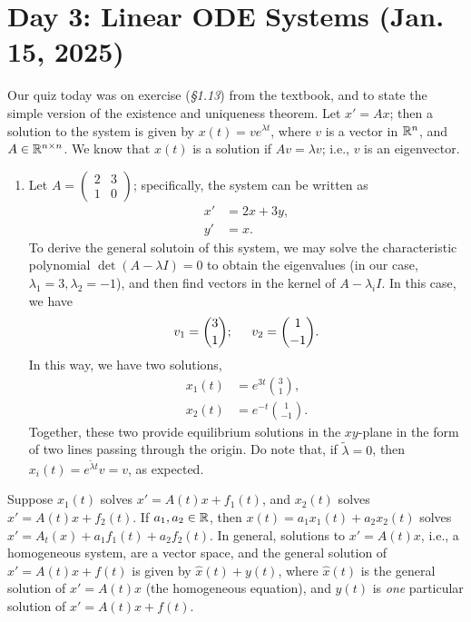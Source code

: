 \section{Day 3: Linear ODE Systems (Jan. 15, 2025)}
Our quiz today was on exercise (\textit{\S 1.13}) from the textbook, and to state the simple version of the existence and uniqueness theorem.
\medskip\newline
Let $x' = Ax$; then a solution to the system is given by $x(t) = ve^{\lambda t}$, where $v$ is a vector in $\mathbb R^n$, and $A \in \mathbb R^{n \times n}$. We know that $x(t)$ is a solution if $Av = \lambda v$; i.e., $v$ is an eigenvector.

\begin{enumerate}[label=(\alph*)]
    \item Let $A = \begin{pmatrix} 2 & 3 \\ 1 & 0 \end{pmatrix}$; specifically, the system can be written as
    \begin{align*}
        x' &= 2x + 3y, \\
        y' &= x.
    \end{align*}
    To derive the general solutoin of this system, we may solve the characteristic polynomial $\det (A - \lambda I) = 0$ to obtain the eigenvalues (in our case, $\lambda_1 = 3, \lambda_2 = -1$), and then find vectors in the kernel of $A - \lambda_i I$. In this case, we have
    \[ v_1 = \binom{3}{1}; \hspace{0.2in} v_2 = \binom{1}{-1}. \]
    In this way, we have two solutions,
    \begin{align*}
        x_1(t) &= e^{3t} \binom{3}{1}, \\
        x_2(t) &= e^{-t} \binom{1}{-1}.
    \end{align*}
    Together, these two provide equilibrium solutions in the $xy$-plane in the form of two lines passing through the origin. Do note that, if $\tilde{\lambda} = 0$, then $x_i(t) = e^{\tilde{\lambda} t} v = v$, as expected.
\end{enumerate}
\begin{simplethm}
    Suppose $x_1(t)$ solves $x' = A(t)x + f_1(t)$, and $x_2(t)$ solves $x' = A(t)x + f_2(t)$. If $a_1, a_2 \in \mathbb R$, then $x(t) = a_1x_1(t) + a_2x_2(t)$ solves $x' = A_t(x) + a_1f_1(t) + a_2f_2(t)$. In general, solutions to $x' = A(t) x$, i.e., a homogeneous system, are a vector space, and the general solution of $x' = A(t)x + f(t)$ is given by $\hat{x}(t) + y(t)$, where $\hat{x}(t)$ is the general solution of $x' = A(t) x$ (the homogeneous equation), and $y(t)$ is \textit{one} particular solution of $x' = A(t) x + f(t)$.
\end{simplethm}
